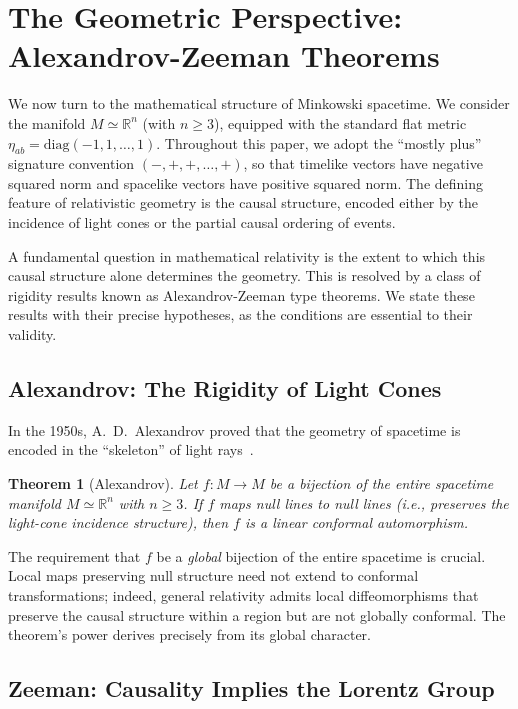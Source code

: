 \documentclass[aps,prd,twocolumn,nofootinbib,superscriptaddress]{revtex4-2}
\newtheorem{theorem}{Theorem}
\begin{document}
\section{The Geometric Perspective: Alexandrov-Zeeman Theorems}
\label{sec:Geometric}

We now turn to the mathematical structure of Minkowski spacetime.
We consider the manifold $M \simeq \mathbb{R}^n$ (with $n \geq 3$), equipped with the standard flat metric $\eta_{ab} = \text{diag}(-1, 1, \dots, 1)$. Throughout this paper, we adopt the ``mostly plus'' signature convention $(-,+,+,\dots,+)$, so that timelike vectors have negative squared norm and spacelike vectors have positive squared norm.
The defining feature of relativistic geometry is the causal structure, encoded either by the incidence of light cones or the partial causal ordering of events.

A fundamental question in mathematical relativity is the extent to which this causal structure alone determines the geometry. This is resolved by a class of rigidity results known as Alexandrov-Zeeman type theorems. We state these results with their precise hypotheses, as the conditions are essential to their validity.

\subsection{Alexandrov: The Rigidity of Light Cones}

In the 1950s, A.~D.~Alexandrov proved that the geometry of spacetime is encoded in the ``skeleton'' of light rays~\cite{alex3}.

\begin{theorem}[Alexandrov]
\label{theorem:Alexandrov}
Let $f: M \to M$ be a \emph{bijection} of the entire spacetime manifold $M \simeq \mathbb{R}^n$ with $n \ge 3$. If $f$ maps null lines to null lines (i.e., preserves the light-cone incidence structure), then $f$ is a linear conformal automorphism.
\end{theorem}

The requirement that $f$ be a \emph{global} bijection of the entire spacetime is crucial. Local maps preserving null structure need not extend to conformal transformations; indeed, general relativity admits local diffeomorphisms that preserve the causal structure within a region but are not globally conformal. The theorem's power derives precisely from its global character.

\subsection{Zeeman: Causality Implies the Lorentz Group}
\end{document}
